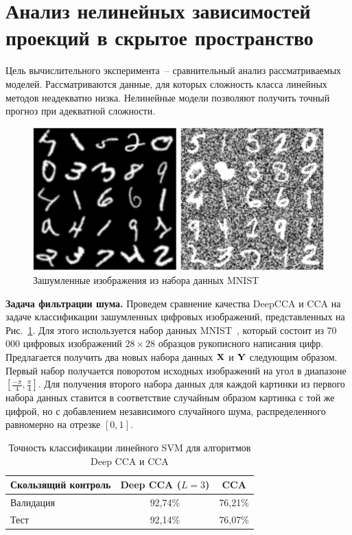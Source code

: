\section{Анализ нелинейных зависимостей проекций в скрытое пространство}
\label{sec:ch2:exp_nonlinear}

Цель вычислительного эксперимента~-- сравнительный анализ рассматриваемых моделей.
Рассматриваются данные, для которых сложность класса линейных методов неадекватно низка.
Нелинейные модели позволяют получить точный прогноз при адекватной сложности.

\begin{figure}[ht]
	\centering 
	\includegraphics[width=\linewidth]{figs/ch2/noisy_mnist}
	\caption{Зашумленные изображения из набора данных MNIST}
	\label{ch2:fig:noisy_mnist}
\end{figure}

\textbf{Задача фильтрации шума.}
Проведем сравнение качества DeepCCA и CCA на задаче классификации зашумленных цифровых изображений, представленных на Рис.~\ref{ch2:fig:noisy_mnist}. Для этого используется набор данных MNIST~\cite{MNIST}, который состоит из 70\,000 цифровых изображений $28 \times 28$ образцов рукописного написания цифр. Предлагается получить два новых набора данных $\mathbf{X}$ и $\mathbf{Y}$ следующим образом. Первый набор получается поворотом исходных изображений на угол в диапазоне $[\frac{-\pi}{4}, \frac{\pi}{4}]$. Для получения второго набора данных для каждой картинки из первого набора данных ставится в соответствие случайным образом картинка с той же цифрой, но с добавлением независимого случайного шума, распределенного равномерно на отрезке $[0,1]$.

\begin{table}[ht]
	\caption{Точность классификации линейного SVM для алгоритмов Deep CCA и CCA}
	\centering
	\begin{tabular}{l|cc}
	\hline
		Скользящий контроль & Deep CCA ($L=3$) & CCA \\  \hline
		Валидация & 92,74\%  &  76,21\%\\
		Тест & 92,14\% & 76,07\% \\
		\hline
	\end{tabular}
	\label{ch2:tbl:svm_cca}
\end{table}

